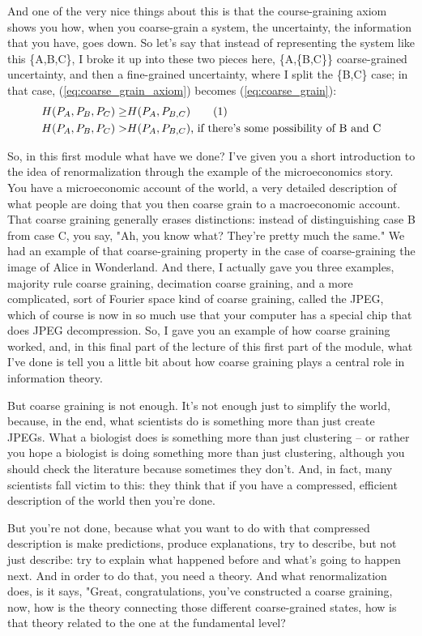 \documentclass[]{article}
\newcommand\numberthis{\addtocounter{equation}{1}\tag{\theequation}}
\begin{document}
And one of the very nice things about this
is that the course-graining axiom shows you how,
when you coarse-grain a system, the uncertainty,
the information that you have, goes down.
So let's say that instead of representing
the system like this \{A,B,C\},
I broke it up into these two pieces here, \{A,\{B,C\}\}
coarse-grained uncertainty,
and then a fine-grained uncertainty,
where I split the \{B,C\} case;
in that case, (\ref{eq:coarse_grain_axiom})  becomes (\ref{eq:coarse_grain}):
\begin{align*}
H (P_A,P_B,P_C) \ge& H(P_A,P_{B,C})  \numberthis \label{eq:coarse_grain}\\
H (P_A,P_B,P_C) >& H(P_A,P_{B,C})\text{, if there's some possibility of B and C}
\end{align*}

So, in this first module what have we done? I've given you a short introduction
to the idea of renormalization through the example of the microeconomics story. You have a microeconomic account of the world,
a very detailed description of what people are doing
that you then coarse grain to a macroeconomic account.
That coarse graining generally erases distinctions:
instead of distinguishing case B from case C,
you say, "Ah, you know what? They're pretty much the same."
We had an example of that coarse-graining property
in the case of coarse-graining the image of Alice in Wonderland.
And there, I actually gave you three examples,
majority rule coarse graining, decimation coarse graining,
and a more complicated, sort of Fourier space kind of coarse graining,
called the JPEG, which of course is now in so much use
that your computer has a special chip that does JPEG decompression.
So, I gave you an example of how coarse graining worked,
and, in this final part of the lecture of this first part of the module,
what I've done is tell you a little bit about
how coarse graining plays a central role in information theory.

But coarse graining is not enough. It's not enough
just to simplify the world, because, in the end, what scientists do
is something more than just create JPEGs. What a biologist does
is something more than just clustering – or rather you hope a biologist is doing
something more than just clustering, although you should check the literature
because sometimes they don't. And, in fact, many scientists
fall victim to this: they think that if you have a compressed,
efficient description of the world then you're done.

But you're not done, because what you want to do
with that compressed description is make predictions, produce explanations,
try to describe, but not just describe: try to explain what happened before
and what's going to happen next. And in order to do that,
you need a theory. And what renormalization does,
is it says, "Great, congratulations, you've constructed a coarse graining,
now, how is the theory connecting those different coarse-grained states,
how is that theory related to the one at the fundamental level?
\end{document}
